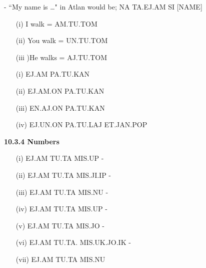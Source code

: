  -  “My name is …" in Atlan would be; NA TA.EJ.AM SI [NAME] \na \ta\ej\am \si {}. 

 

\begin{itemize}
    \item[(i)]I walk = AM.TU.TOM \am\tu\tom 

    \item[(ii)]You walk = UN.TU.TOM \un\tu\tom 

    \item[(iii])He walks = AJ.TU.TOM \aj\tu\tom 
\end{itemize}
 




\begin{itemize}
    \item[(i)]  EJ.AM PA.TU.KAN \ej\am \pa\tu\kan 

    \item[(ii)] EJ.AM.ON PA.TU.KAN \ej\am\on \pa\tu\kan 

    \item[(iii)]EN.AJ.ON PA.TU.KAN \ej\aj\on \pa\tu\kan 

    \item[(iv)]EJ.UN.ON PA.TU.LAJ ET.JAN.POP \ej\un\on \pa\tu\laj  \et\jan\pop 
\end{itemize}

\noindent \textbf{10.3.4 Numbers} 
\begin{itemize}
    \item[(i)]EJ.AM TU.TA MIS.UP - \ej\am \tu\ta \mis\up 

    \item[(ii)]EJ.AM TU.TA MIS.JI.IP - \ej\am \tu\ta \mis\ji\ip 

    \item[(iii)]EJ.AM TU.TA MIS.NU - \ej\am \tu\ta \mis\nu 

\item[(iv)] EJ.AM TU.TA MIS.UP  - \ej\am \tu\ta \mis\up 

    \item[(v)] EJ.AM TU.TA MIS.JO - \ej\am \tu\ta \mis\jo 

    \item[(vi)] EJ.AM TU.TA. MIS.UK.JO.IK - \ej\am \tu\ta \mis\uk\jo\ik 

    \item[(vii)] EJ.AM TU.TA MIS.NU \ej\am \tu\ta \mis\nu
\end{itemize}
